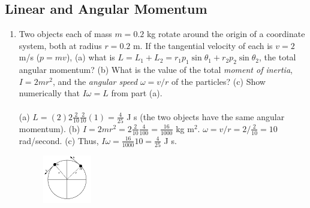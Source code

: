 \documentclass[10pt]{article}
\begin{document}
\subsection{Linear and Angular Momentum}
\begin{enumerate}
\item Two objects each of mass $m = 0.2$ kg rotate around the origin of a coordinate system, both at radius $r = 0.2$ m.  If the tangential velocity of each is $v = 2$ m/s ($p = mv$), (a) what is $L = L_1 + L_2 = r_1 p_1\sin\theta_1+r_2 p_2\sin\theta_2$, the total angular momentum?  (b) What is the value of the total \textit{moment of inertia}, $I = 2mr^2$, and the \textit{angular speed} $\omega = v/r$ of the particles?  (c) Show numerically that $I\omega = L$ from part (a). \\ \\
(a) $L = (2)2\frac{2}{10}\frac{2}{10}(1) = \frac{4}{25}$ J s (the two objects have the same angular momentum).  (b) $I = 2mr^2 = 2\frac{2}{10}\frac{4}{100} = \frac{16}{1000}$ kg m$^2$. $\omega = v/r = 2/\frac{2}{10} = 10$ rad/second.  (c) Thus, $I\omega = \frac{16}{1000}10 = \frac{4}{25}$ J s.
\begin{figure}[hb]
\centering
\includegraphics[width=0.2\textwidth]{rotate.pdf}
\end{figure}
\end{enumerate}
\end{document}
